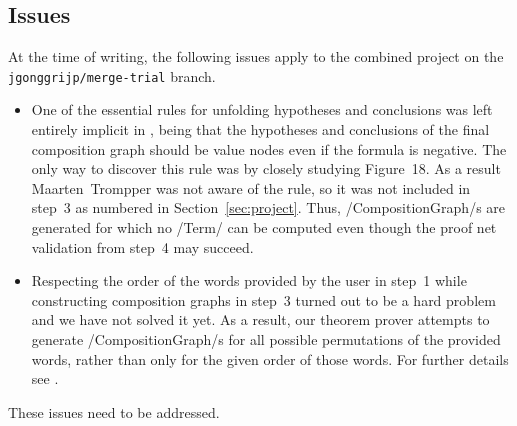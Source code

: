 \documentclass[12pt,a4paper]{article}
\begin{document}
\subsection{Issues}\label{sub:issues}

At the time of writing, the following issues apply to the combined project on the \texttt{jgonggrijp/merge-trial} branch.
\begin{itemize}
    \item One of the essential rules for unfolding hypotheses and conclusions was left entirely implicit in \cite{mm12}, being that the hypotheses and conclusions of the final composition graph should be value nodes even if the formula is negative. The only way to discover this rule was by closely studying Figure~18. As a result Maarten~Trompper was not aware of the rule, so it was not included in step~3 as numbered in Section~\ref{sec:project}. Thus, \hs/CompositionGraph/s are generated for which no \hs/Term/ can be computed even though the proof net validation from step~4 may succeed.
    \item Respecting the order of the words provided by the user in step~1 while constructing composition graphs in step~3 turned out to be a hard problem and we have not solved it yet. As a result,  our theorem prover attempts to generate \hs/CompositionGraph/s for all possible permutations of the provided words, rather than only for the given order of those words. For further details see \cite{maarten}.
\end{itemize}
These issues need to be addressed.
\end{document}
